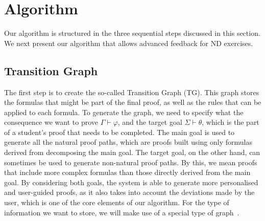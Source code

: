 \section{Algorithm}
Our algorithm is structured in the three sequential steps discussed in this section.
We next present our algorithm that allows advanced feedback for ND exercises.


\subsection{Transition Graph}
The first step is to create the so-called Transition Graph (TG). This graph stores the formulas that might be part of the final proof, as well as the rules that can be applied to each formula. 
To generate the graph, we need to specify what the consequence we want to prove \(\Gamma \vdash \varphi\), and the target goal \(\Sigma \vdash \theta\), which is the part of a student's proof that needs to be completed. The main goal is used to generate all the natural proof paths, which are proofs built using only formulas derived from decomposing the main goal. The target goal, on the other hand, can sometimes be used to generate non-natural proof paths. By this, we mean proofs that include more complex formulas than those directly derived from the main goal. By considering both goals, the system is able to generate more personalised and user-guided proofs, as it also takes into account the deviations made by the user, which is one of the core elements of our algorithm. For the type of information we want to store, we will make use of a special type of graph~\cite{DBLP:journals/corr/abs-2002-05014}.

